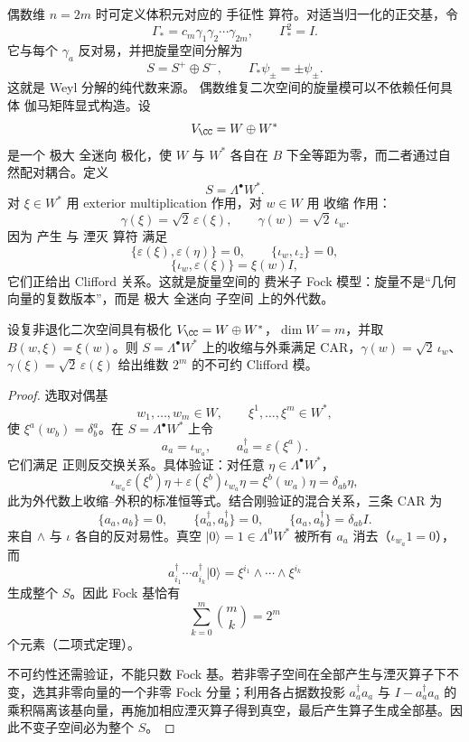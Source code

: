 偶数维 $n=2m$ 时可定义体积元对应的 手征性 算符。对适当归一化的正交基，令
\[
\Gamma_*=c_m\gamma_1\gamma_2\cdots\gamma_{2m},
\qquad
\Gamma_*^2=I.
\]
它与每个 $\gamma_a$ 反对易，并把旋量空间分解为
\[
S=S^+\oplus S^-,
\qquad
\Gamma_*\psi_\pm=\pm\psi_\pm.
\]
这就是 Weyl 分解的纯代数来源。
偶数维复二次空间的旋量模可以不依赖任何具体 伽马矩阵显式构造。设
\[
V_{\CC}=W\oplus W^*
\]
是一个 极大 全迷向 极化，使 $W$ 与 $W^*$ 各自在 $B$ 下全等距为零，而二者通过自然配对耦合。定义
\begin{equation*}S=\Lambda^\bullet W^*.\end{equation*}
对 $\xi\in W^*$ 用 exterior multiplication 作用，对 $w\in W$ 用 收缩 作用：
\[
\gamma(\xi)=\sqrt2\,\varepsilon(\xi),
\qquad
\gamma(w)=\sqrt2\,\iota_w.
\]
因为 产生 与 湮灭 算符 满足
\[
\{\varepsilon(\xi),\varepsilon(\eta)\}=0,
\qquad
\{\iota_w,\iota_z\}=0,
\]
\[
\{\iota_w,\varepsilon(\xi)\}=\xi(w)I,
\]
它们正给出 Clifford 关系。这就是旋量空间的 费米子 Fock 模型：旋量不是“几何向量的复数版本”，而是 极大 全迷向 子空间 上的外代数。

\begin{proposition}[极化外代数上的不可约旋量模]
设复非退化二次空间具有极化 $V_\CC=W\oplus W^*$，$\dim W=m$，并取 $B(w,\xi)=\xi(w)$。则 $S=\Lambda^\bullet W^*$ 上的收缩与外乘满足 CAR，$\gamma(w)=\sqrt2\,\iota_w$、$\gamma(\xi)=\sqrt2\,\varepsilon(\xi)$ 给出维数 $2^m$ 的不可约 Clifford 模。
\end{proposition}
\begin{proof}
选取对偶基
\[
w_1,\ldots,w_m\in W,
\qquad
\xi^1,\ldots,\xi^m\in W^*,
\]
使 $\xi^a(w_b)=\delta^a_b$。在 $S=\Lambda^\bullet W^*$ 上令
\[
a_a=\iota_{w_a},
\qquad
a_a^\dagger=\varepsilon(\xi^a).
\]
它们满足 正则反交换关系。具体验证：对任意 $\eta\in\Lambda^\bullet W^*$，
\[
\iota_{w_a}\varepsilon(\xi^b)\eta+\varepsilon(\xi^b)\iota_{w_a}\eta
=\xi^b(w_a)\eta=\delta_{ab}\eta,
\]
此为外代数上收缩--外积的标准恒等式。结合刚验证的混合关系，三条 CAR 为
\[
\{a_a,a_b\}=0,
\qquad
\{a_a^\dagger,a_b^\dagger\}=0,
\qquad
\{a_a,a_b^\dagger\}=\delta_{ab}I.
\]
来自 $\wedge$ 与 $\iota$ 各自的反对易性。真空 $|0\rangle=1\in\Lambda^0W^*$ 被所有 $a_a$ 消去（$\iota_{w_a}1=0$），而
\[
a_{i_1}^\dagger\cdots a_{i_k}^\dagger|0\rangle
=\xi^{i_1}\wedge\cdots\wedge\xi^{i_k}
\]
生成整个 $S$。因此 Fock 基恰有
\[
\sum_{k=0}^m\binom mk=2^m
\]
个元素（二项式定理）。

不可约性还需验证，不能只数 Fock 基。若非零子空间在全部产生与湮灭算子下不变，选其非零向量的一个非零 Fock 分量；利用各占据数投影 $a_a^\dagger a_a$ 与 $I-a_a^\dagger a_a$ 的乘积隔离该基向量，再施加相应湮灭算子得到真空，最后产生算子生成全部基。因此不变子空间必为整个 $S$。
\end{proof}


